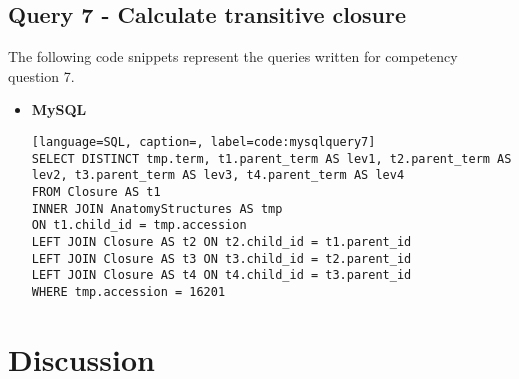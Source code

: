 \subsection*{Query 7 - Calculate transitive closure}\label{query7}
The following code snippets represent the queries written for competency question 7.
\begin{itemize}
\item \textbf{MySQL}
\begin{lstlisting}[language=SQL, caption=, label=code:mysqlquery7]
SELECT DISTINCT tmp.term, t1.parent_term AS lev1, t2.parent_term AS lev2, t3.parent_term AS lev3, t4.parent_term AS lev4
FROM Closure AS t1
INNER JOIN AnatomyStructures AS tmp
ON t1.child_id = tmp.accession
LEFT JOIN Closure AS t2 ON t2.child_id = t1.parent_id
LEFT JOIN Closure AS t3 ON t3.child_id = t2.parent_id
LEFT JOIN Closure AS t4 ON t4.child_id = t3.parent_id
WHERE tmp.accession = 16201
\end{lstlisting}
\end{itemize}
\section{Discussion}\label{discussion}
